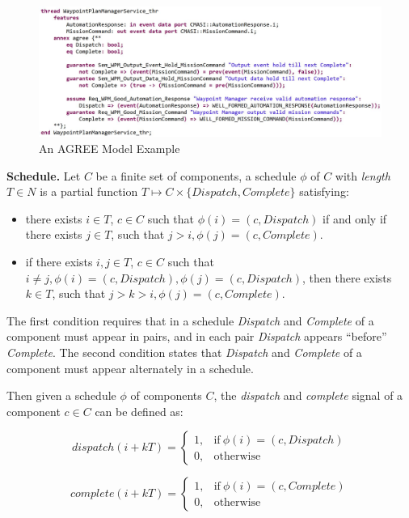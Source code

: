 \begin{figure}[ht!]
\centering
\includegraphics[width=130mm]{wpmAGREE.jpg}
\caption{An AGREE Model Example\label{wpmAGREE}}
\end{figure}

{\bf Schedule.}
Let $C$ be a finite set of components, a schedule $\phi$ of $C$ with \emph{length} $T\in N$ is a partial function $T \mapsto C\times \{Dispatch, Complete\}$ satisfying:
\begin{itemize}
	\item there exists $i\in T$, $c\in C$ such that $\phi(i) = (c, Dispatch)$ if and only if there exists $j\in T$, such that $j > i, \phi(j) =  (c, Complete)$.
	\item if there exists $i, j\in T$, $c\in C$ such that $i \neq j, \phi(i) = (c, Dispatch), \phi(j) = (c, Dispatch)$, then there exists $k\in T$, such that $j >k> i, \phi(j) =  (c, Complete)$.
\end{itemize}
The first condition requires that in a schedule \emph{Dispatch} and \emph{Complete} of a component must appear in pairs, and in each pair \emph{Dispatch} appears ``before'' \emph{Complete}. The second condition states that \emph{Dispatch} and \emph{Complete} of a component must appear alternately in a schedule. 

Then given a schedule $\phi$ of components $C$, the \emph{dispatch} and \emph{complete} signal of a component $c \in C$ can be defined as:
  
\begin{equation}
\label{eqn:dispatch}
    dispatch(i+kT) =
    \begin{cases}
      1, & \text{if}\ \phi(i) = (c, Dispatch) \\
      0, & \text{otherwise}
    \end{cases}
\end{equation}

\begin{equation}
\label{eqn:complete}
    complete(i+kT) =
    \begin{cases}
      1, & \text{if}\ \phi(i) = (c, Complete) \\
      0, & \text{otherwise}
    \end{cases}
\end{equation}

